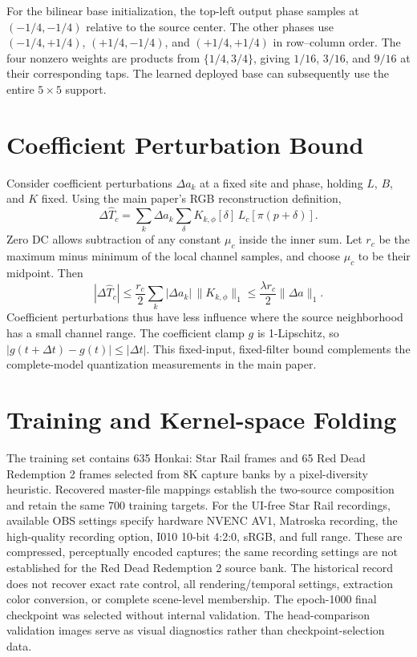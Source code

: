 \documentclass[10pt,twocolumn,letterpaper]{article}
\begin{document}
For the bilinear base initialization, the top-left output phase samples at $(-1/4,-1/4)$ relative to the source center.
The other phases use $(-1/4,+1/4)$, $(+1/4,-1/4)$, and $(+1/4,+1/4)$ in row--column order.
The four nonzero weights are products from $\{1/4,3/4\}$, giving $1/16$, $3/16$, and $9/16$ at their corresponding taps.
The learned deployed base can subsequently use the entire $5\times5$ support.

\section{Coefficient Perturbation Bound}
\label{app:bound}
Consider coefficient perturbations $\Delta a_k$ at a fixed site and phase, holding $L$, $B$, and $K$ fixed.
Using the main paper's RGB reconstruction definition,
\begin{equation}
 \Delta\widehat T_c=
   \sum_k\Delta a_k\sum_\delta K_{k,\phi}[\delta]\,
                                   L_c[\pi(p+\delta)].
\end{equation}
Zero DC allows subtraction of any constant $\mu_c$ inside the inner sum.
Let $r_c$ be the maximum minus minimum of the local channel samples, and choose $\mu_c$ to be their midpoint.
Then
\begin{equation}
 |\Delta\widehat T_c|
 \leq\frac{r_c}{2}\sum_k|\Delta a_k|\,\|K_{k,\phi}\|_1
 \leq\frac{\lambda r_c}{2}\|\Delta a\|_1.
 \label{eq:bound}
\end{equation}
Coefficient perturbations thus have less influence where the source neighborhood has a small channel range.
The coefficient clamp $g$ is 1-Lipschitz, so $|g(t+\Delta t)-g(t)|\leq|\Delta t|$.
This fixed-input, fixed-filter bound complements the complete-model quantization measurements in the main paper.


\section{Training and Kernel-space Folding}
\label{sec:training-folding}
The training set contains 635 Honkai: Star Rail frames and 65 Red Dead Redemption 2 frames selected from 8K capture banks by a pixel-diversity heuristic.
Recovered master-file mappings establish the two-source composition and retain the same 700 training targets.
For the UI-free Star Rail recordings, available OBS settings specify hardware NVENC AV1, Matroska recording, the high-quality recording option, I010 10-bit 4:2:0, sRGB, and full range.
These are compressed, perceptually encoded captures; the same recording settings are not established for the Red Dead Redemption 2 source bank.
The historical record does not recover exact rate control, all rendering/temporal settings, extraction color conversion, or complete scene-level membership.
The epoch-1000 final checkpoint was selected without internal validation.
The head-comparison validation images serve as visual diagnostics rather than checkpoint-selection data.
\end{document}

